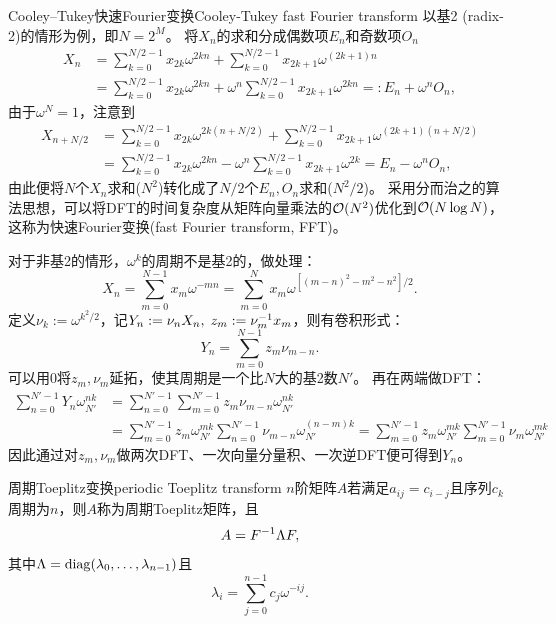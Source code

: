 \begin{theorem}
    {Cooley--Tukey快速Fourier变换}{Cooley-Tukey fast Fourier transform}
    以基2 (radix-2)的情形为例，即$N=2^M$。
    将$X_n$的求和分成偶数项$E_n$和奇数项$O_n$
    \begin{align*}
        X_n&=\sum_{k=0}^{N/2-1}x_{2k}\omega^{2kn}+\sum_{k=0}^{N/2-1}x_{2k+1}\omega^{(2k+1)n}\\
        &=\sum_{k=0}^{N/2-1}x_{2k}\omega^{2kn}+\omega^n\sum_{k=0}^{N/2-1}x_{2k+1}\omega^{2kn}=:E_n+\omega^nO_n,
    \end{align*}
    由于$\omega^N=1$，注意到
    \begin{align*}
        X_{n+N/2}&=\sum_{k=0}^{N/2-1}x_{2k}\omega^{2k(n+N/2)}+\sum_{k=0}^{N/2-1}x_{2k+1}\omega^{(2k+1)(n+N/2)}\\
        &=\sum_{k=0}^{N/2-1}x_{2k}\omega^{2kn}-\omega^n\sum_{k=0}^{N/2-1}x_{2k+1}\omega^{2k}=E_n-\omega^nO_n,
    \end{align*}
    由此便将$N$个$X_n$求和($N^2$)转化成了$N/2$个$E_n,O_n$求和($N^2/2$)。
    采用分而治之的算法思想，可以将DFT的时间复杂度从矩阵向量乘法的$\mathcal{O}(N^2)$优化到$\mathcal{O}(N\log N)$，这称为快速Fourier变换(fast Fourier transform, FFT)。
    \begin{notecaptionblock}
        \label{fig:FFT}
    \end{notecaptionblock}
    \tcblower
    对于非基2的情形，$\omega^k$的周期不是基2的，做处理：
    \[
        X_n=\sum_{m=0}^{N-1}x_m\omega^{-mn}=\sum_{m=0}^Nx_m\omega^{[(m-n)^2-m^2-n^2]/2}.
    \]
    定义$\nu_k:=\omega^{k^2/2}$，记$Y_n:=\nu_nX_n,\;z_m:=\nu_m^{-1} x_m$，则有卷积形式：
    \[
        Y_n=\sum_{m=0}^{N-1}z_m\nu_{m-n}.
    \]
    可以用0将$z_m,\nu_m$延拓，使其周期是一个比$N$大的基2数$N'$。
    再在两端做DFT：
    \begin{align*}
        \sum_{n=0}^{N'-1}Y_n\omega_{N'}^{nk}&=\sum_{n=0}^{N'-1}\sum_{m=0}^{N'-1}z_m\nu_{m-n}\omega_{N'}^{nk}\\
        &=\sum_{m=0}^{N'-1}z_m\omega_{N'}^{mk}\sum_{n=0}^{N'-1}\nu_{m-n}\omega_{N'}^{(n-m)k}=\sum_{m=0}^{N'-1}z_m\omega_{N'}^{mk}\sum_{m=0}^{N'-1}\nu_m\omega_{N'}^{mk}
    \end{align*}
    因此通过对$z_m,\nu_m$做两次DFT、一次向量分量积、一次逆DFT便可得到$Y_n$。
\end{theorem}

\begin{theorem}
    {周期Toeplitz变换}{periodic Toeplitz transform}
    $n$阶矩阵$A$若满足$a_{ij}=c_{i-j}$且序列$c_k$周期为$n$，则$A$称为周期Toeplitz矩阵，且
    \begin{equation}
        A=F^{-1}\Lambda F,
    \end{equation}
    其中$\Lambda=\operatorname{diag}(\lambda_0,\ldots,\lambda_{n-1})$且
    \begin{equation}
        \lambda_i=\sum_{j=0}^{n-1}c_j\omega^{-ij}.
    \end{equation}
\end{theorem}

